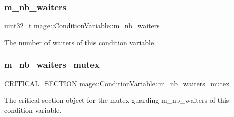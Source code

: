 \subsubsection{\texorpdfstring{m\+\_\+nb\+\_\+waiters}{m\_nb\_waiters}}
{\footnotesize\ttfamily uint32\+\_\+t mage\+::\+Condition\+Variable\+::m\+\_\+nb\+\_\+waiters\hspace{0.3cm}{\ttfamily [private]}}

The number of waiters of this condition variable. \hypertarget{structmage_1_1_condition_variable_a0686e682d62d44ff1eb9ac45acbb0eab}{}\label{structmage_1_1_condition_variable_a0686e682d62d44ff1eb9ac45acbb0eab} 
\subsubsection{\texorpdfstring{m\+\_\+nb\+\_\+waiters\+\_\+mutex}{m\_nb\_waiters\_mutex}}
{\footnotesize\ttfamily C\+R\+I\+T\+I\+C\+A\+L\+\_\+\+S\+E\+C\+T\+I\+ON mage\+::\+Condition\+Variable\+::m\+\_\+nb\+\_\+waiters\+\_\+mutex\hspace{0.3cm}{\ttfamily [private]}}

The critical section object for the mutex guarding {\ttfamily m\+\_\+nb\+\_\+waiters} of this condition variable. 